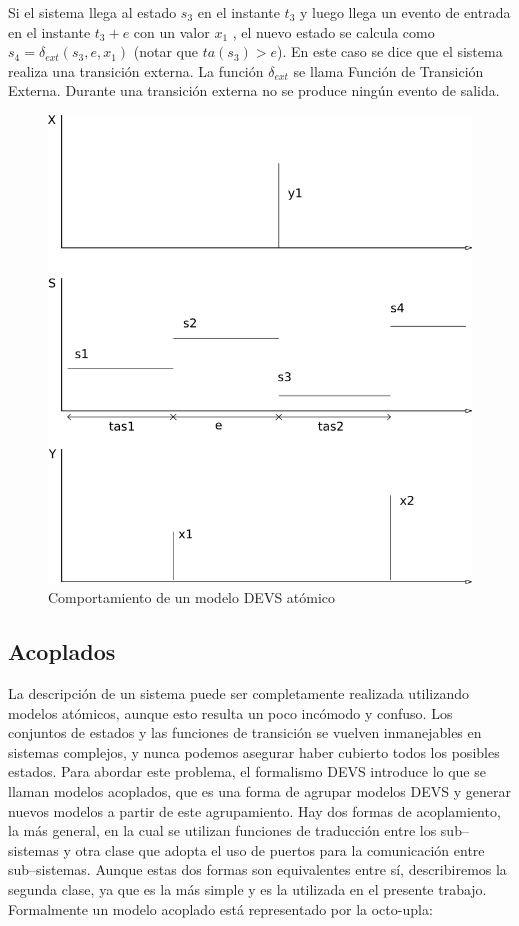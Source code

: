 \documentclass[a4paper,	11pt]{report}
\begin{document}
Si el sistema llega al estado $s_3$ en el instante $t_3$ y luego llega un evento de entrada en el instante $t_3 + e$ con un valor $x_1$ , el nuevo estado se calcula como $s_4 = \delta_{ext} (s_3 , e, x_1 )$ (notar que $ta(s_3 ) > e$). En este caso se dice que el sistema realiza una transición externa. La función $\delta_{ext}$ se llama Función de Transición Externa. Durante una transición externa no se produce ningún evento de salida.

\begin{figure}[!htbp]
  \includegraphics[scale=0.5]{devs-atomic}
  \caption{Comportamiento de un modelo DEVS atómico}
   \label{fig:fig2-5}
\end{figure}


\subsection{Acoplados}
La descripción de un sistema puede ser completamente realizada utilizando modelos atómicos, aunque esto resulta un poco incómodo y confuso. Los conjuntos de estados y las funciones de transición se vuelven inmanejables en sistemas complejos, y nunca podemos asegurar haber cubierto todos los posibles estados.
Para abordar este problema, el formalismo DEVS introduce lo que se llaman modelos acoplados, que es una forma de agrupar modelos DEVS y generar nuevos modelos a partir de este agrupamiento.
Hay dos formas de acoplamiento, la más general, en la cual se utilizan funciones de traducción entre los sub–sistemas y otra clase que adopta el uso de puertos para la comunicación entre sub–sistemas. Aunque estas dos formas son equivalentes entre sí, describiremos la segunda clase, ya que es la más simple y es la utilizada en el presente trabajo.
Formalmente un modelo acoplado está representado por la octo-upla:
\end{document}
